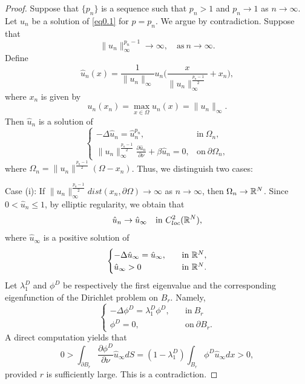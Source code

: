 \documentclass[12pt,reqno]{amsart}
\numberwithin{equation}{section}
\theoremstyle{definition}
\def\R{{\mathfrak R}}
\def\R{\Bbb R}
\begin{document}
\begin{proof}
Suppose that $\{p_n\}$ is a sequence such that $p_n>1$ and $p_n\to 1$ as $n\to\infty$. Let $u_n$ be a solution of \eqref{eq0.1} for $p=p_n$. We argue by contradiction. Suppose that 
$$
\|u_n\|^{p_n-1}_\infty\to \infty,\quad \text{as}\ n\to\infty.
$$
Define  
$$
\hat{u}_{n}(x)=\frac{1}{\|u_{n}\|_\infty}u_n\Big(\frac{x}{\|u_{n}\|_\infty^{\frac{p_n-1}{2}}}+x_{n}\Big),
$$
where $x_n$ is given by
$$
u_n(x_n)=\max_{x\in\Omega}u_n(x)=\|u_n\|_\infty.
$$
Then $\hat{u}_n$ is a solution of 
\begin{equation}
\begin{cases}
-\Delta \hat{u}_n=\hat{u}_n^{p_n},\quad &\text{in}\ \Omega_n,\\
\|u_n\|_\infty^{\frac{p_n-1}{2}}\frac{\partial \hat{u}_n}{\partial \nu}+\beta \hat{u}_n=0, &\text{on}\ \partial\Omega_n,
\end{cases}
\end{equation}
where $\Omega_n=\|u_n\|^{\frac{p_n-1}{2}}(\Omega-x_n)$. Thus, we distinguish two cases:

Case (i): If $\|u_n\|_\infty^{\frac{p_n-1}{2}}dist(x_n,\partial\Omega)\to \infty$ as $n\to\infty$, then $\Omega_n\to \R^N$. Since $0<\hat{u}_n\leq 1$, by elliptic regularity, we obtain that 
$$
\hat{u}_n\to \hat{u}_\infty\quad \text{in}\  C^2_{loc}(\R^N),
$$ 
where $\hat{u}_\infty$ is a positive solution of 
\begin{equation}\label{2.5}
\begin{cases}
-\Delta \hat{u}_\infty=\hat{u}_\infty,\quad &\text{in}\ \R^N,\\
\hat{u}_\infty>0 &\text{in}\ \R^N.
\end{cases}
\end{equation}
Let $\lambda_1^D$ and $\phi^D$ be respectively the first eigenvalue and the corresponding eigenfunction of the Dirichlet problem on $B_r$. Namely, 
\begin{equation}
\begin{cases}
-\Delta \phi^D=\lambda_1^D\phi^D,\quad &\text{in}\ B_r\\
\phi^D=0, &\text{on}\ \partial B_r.
\end{cases}
\end{equation}
A direct computation yields that 
$$
0>\int_{\partial B_r}\frac{\partial \phi^D}{\partial \nu}\hat{u}_\infty dS=(1-\lambda_1^D)\int_{B_r}\phi^D \hat{u}_\infty dx>0,
$$ 
provided $r$ is sufficiently large. This is a contradiction.



\end{proof}
\end{document}
